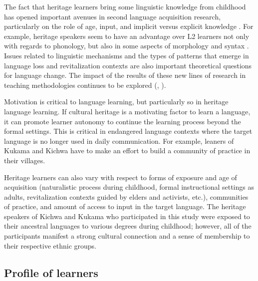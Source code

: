 \documentclass[output=paper]{langscibook}
\begin{document}
The fact that heritage learners bring some linguistic knowledge from childhood has opened important avenues in second language acquisition research, particularly on the role of age, input, and implicit versus explicit knowledge \citep{Valdés2005}. For example, heritage speakers seem to have an advantage over L2 learners not only with regards to phonology, but also in some aspects of morphology and syntax \citep{Montrul2008}. Issues related to linguistic mechanisms and the types of patterns that emerge in language loss and revitalization contexts \citep{Hinton2001} are also important theoretical questions for language change. The impact of the results of these new lines of research in teaching methodologies continues to be explored (\citealt{Parodi2008}, \citealt{Potowski2018}).

Motivation is critical to language learning, but particularly so in heritage language learning. If cultural heritage is a motivating factor to learn a language, it can promote learner autonomy to continue the learning process beyond the formal settings. This is critical in endangered language contexts where the target language is no longer used in daily communication. For example, leaners of Kukama and Kichwa have to make an effort to build a community of practice in their villages.

Heritage learners can also vary with respect to forms of exposure and age of acquisition (naturalistic process during childhood, formal instructional settings as adults, revitalization contexts guided by elders and activists, etc.), communities of practice, and amount of access to input in the target language. The heritage speakers of Kichwa and Kukama who participated in this study were exposed to their ancestral languages to various degrees during childhood; however, all of the participants manifest a strong cultural connection and a sense of membership to their respective ethnic groups.

\subsection{Profile of learners}\label{sec:7:3.2}
\end{document}
